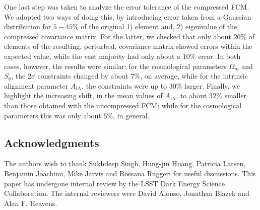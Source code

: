 \documentclass[aps, prd, twocolumn, superscriptaddress, nofootinbib, amssymb, amsmath]{revtex4-2}
\begin{document}
One last step was taken to analyze the error tolerance of the compressed FCM. We adopted two ways of doing this, by introducing error taken from a Gaussian distribution for $5 - 45 \%$ of the original 1) element and, 2) eigenvalue of the compressed covariance matrix. For the latter, we checked that only about $20 \%$ of elements of the resulting, perturbed, covariance matrix showed errors within the expected value, while the vast majority had only about a $10\%$ error. In both cases, however, the results were similar: for the cosmological parameters $\Omega_m$ and $S_8$, the $2\sigma$ constraints changed by about $7\%$, on average, while for the intrinsic alignment parameter $A_{\text{IA}}$, the constraints were up to $30\%$ larger. Finally, we highlight the increasing shift, in the mean values of $A_{\text{IA}}$, to about $32\%$ smaller than those obtained with the uncompressed FCM; while for the cosmological parameters this was only about $5\%$, in general.

	\subsection*{Acknowledgments}
	
	The authors wish to thank Sukhdeep Singh, Hung-jin Huang, Patricia Larsen, Benjamin Joachimi, Mike Jarvis and Rossana Ruggeri for useful discussions. %
	This paper has undergone internal review by the LSST Dark Energy Science Collaboration. The internal reviewers were David Alonso, Jonathan Blazek and Alan F. Heavens.
	
	
	
	
	
	
	
\end{document}
